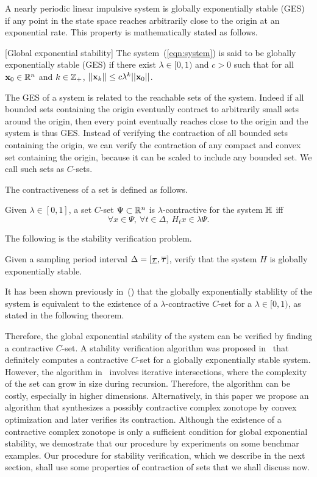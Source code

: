 A nearly periodic linear impulsive system is globally exponentially
stable (GES) if any point in the state space reaches arbitrarily close
to the origin at an exponential rate.  This property is mathematically
stated as follows.
%
\begin{defn}\label{defn:exp-stable}[Global exponential stability] The
system~(\ref{eqn:system}) is said to be globally exponentially stable
(GES) if there exist $\lambda\in[0,1)$ and $c>0$ such that for all $\textbf{x}_0
\in\mathbb{R}^n$ and $k\in\mathbb{Z}_+$,
$||\textbf{x}_k||\leq c\lambda^k||\textbf{x}_0||$.
\end{defn}
%
The GES of a system is related to the reachable sets of the
system. Indeed if all bounded sets containing the origin eventually
contract to arbitrarily small sets around the origin, then every point
eventually reaches close to the origin and the system is thus
GES. Instead of verifying the contraction of all bounded sets
containing the origin, we can verify the contraction of any compact
and convex set containing the origin, because it can be scaled to
include any bounded set. We
call such sets as $C$-sets.

The contractiveness of a set is defined as follows.
%
\begin{definition}
Given $\lambda\in[0,1]$, a set $C$-set $\Psi\subset\mathbb{R}^n$ is
$\lambda$-contractive for the system $\mathbb{H}$ iff
\[\forall x\in\Psi,~\forall t\in\Delta,~H_tx\in\lambda\Psi.\]
\end{definition}
%
The following is the stability verification problem.
%
\begin{problem}
Given a sampling period interval $\Delta=[\bm{\underline{\tau}},\bm{\overline{\tau}}]$, verify
that the system $H$ is globally exponentially stable.
\end{problem}
%
\begin{remark} It has been shown previously
in~(\cite{2014-fiacchini-set,athanasopoulos2014alternative,AlKhatib2015})
that the globally exponentially stablility of the system is equivalent
to the existence of a $\lambda$-contractive $C$-set for a
$\lambda\in[0,1)$, as stated in the following theorem.
\end{remark}
%
Therefore, the global exponential stability of the system can be
verified by finding a contractive $C$-set.  A stability verification
algorithm was proposed in~\cite{todo} that definitely computes a
contractive $C$-set for a globally exponentially stable system.
However, the algorithm in~\cite{todo} involves iterative
intersections, where the complexity of the set can grow in size during
recursion.  Therefore, the algorithm can be costly, especially in
higher dimensions.  Alternatively, in this paper we propose an
algorithm that synthesizes a possibly contractive complex zonotope by
convex optimization and later verifies its contraction.  Although the
existence of a contractive complex zonotope is only a sufficient
condition for global exponential stability, we demostrate that our
procedure by experiments on some benchmar examples.  Our procedure for
stability verification, which we describe in the next section, shall
use some properties of contraction of sets that we shall discuss now.

